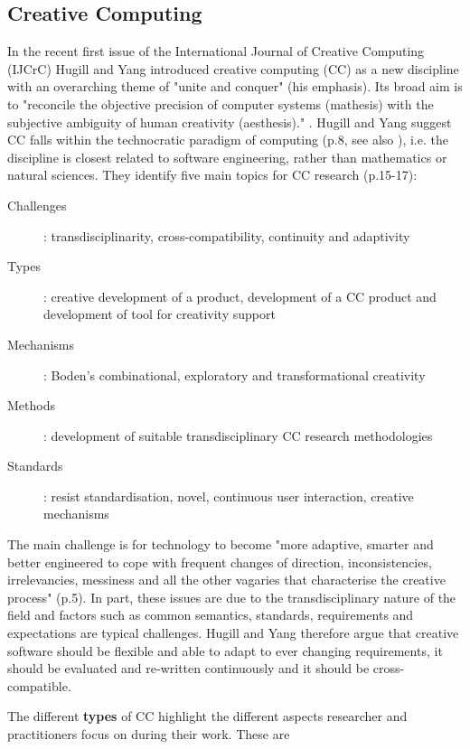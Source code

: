\subsection{Creative Computing}

In the recent first issue of the International Journal of Creative Computing (IJCrC) Hugill and Yang introduced creative computing (CC) as a new discipline \citep{Hugill2013c} with an overarching theme of "unite and conquer" \citep[p.1]{Yang2013}(his emphasis). Its broad aim is to "reconcile the objective precision of computer systems (mathesis) with the subjective ambiguity of human creativity (aesthesis)." \citep[p.5]{Hugill2013c}. Hugill and Yang suggest CC falls within the technocratic paradigm of computing (p.8, see also \citep{Eden2007}), i.e. the discipline is closest related to software engineering, rather than mathematics or natural sciences. They identify five main topics for CC research (p.15-17):

\begin{description}
\item [Challenges]: transdisciplinarity, cross-compatibility, continuity and adaptivity
\item [Types]: creative development of a product, development of a CC product and development of tool for creativity support
\item [Mechanisms]:	Boden’s combinational, exploratory and transformational creativity
\item [Methods]:	development of suitable transdisciplinary CC research methodologies
\item [Standards]: 	resist standardisation, novel, continuous user interaction, creative mechanisms
\end{description}

The main challenge is for technology  to become "more adaptive, smarter and better engineered to cope with frequent changes of direction, inconsistencies, irrelevancies, messiness and all the other vagaries that characterise the creative process" (p.5). In part, these issues are due to the transdisciplinary nature of the field and factors such as common semantics, standards, requirements and expectations are typical challenges. Hugill and Yang therefore argue that creative software should be flexible and able to adapt to ever changing requirements, it should be evaluated and re-written continuously and it should be cross-compatible.

The different \textbf{types} of CC highlight the different aspects researcher and practitioners focus on during their work. These are


